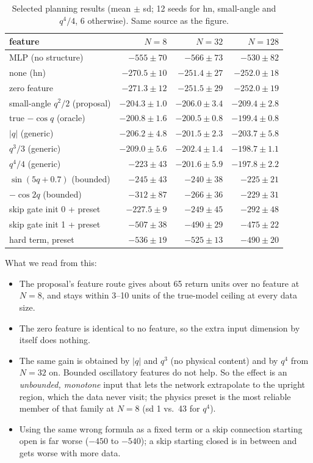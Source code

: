 \documentclass[11pt]{article}
\begin{document}
\begin{table}[h]
\centering\small
\caption{Selected planning results (mean $\pm$ sd; 12 seeds for hn, small-angle and $q^4/4$, 6 otherwise). Same source as the figure.}
\begin{tabular}{lrrr}
\toprule
feature & $N=8$ & $N=32$ & $N=128$ \\
\midrule
MLP (no structure) & $-555\pm70$ & $-566\pm73$ & $-530\pm82$ \\
none (hn) & $-270.5\pm10$ & $-251.4\pm27$ & $-252.0\pm18$ \\
zero feature & $-271.3\pm12$ & $-251.5\pm29$ & $-252.0\pm19$ \\
small-angle $q^2/2$ (proposal) & $\mathbf{-204.3\pm1.0}$ & $-206.0\pm3.4$ & $-209.4\pm2.8$ \\
true $-\cos q$ (oracle) & $-200.8\pm1.6$ & $-200.5\pm0.8$ & $-199.4\pm0.8$ \\
$|q|$ (generic) & $-206.2\pm4.8$ & $-201.5\pm2.3$ & $-203.7\pm5.8$ \\
$q^3/3$ (generic) & $-209.0\pm5.6$ & $-202.4\pm1.4$ & $-198.7\pm1.1$ \\
$q^4/4$ (generic) & $-223\pm43$ & $-201.6\pm5.9$ & $-197.8\pm2.2$ \\
$\sin(5q+0.7)$ (bounded) & $-245\pm43$ & $-240\pm38$ & $-225\pm21$ \\
$-\cos 2q$ (bounded) & $-312\pm87$ & $-266\pm36$ & $-229\pm31$ \\
skip gate init 0 + preset & $-227.5\pm9$ & $-249\pm45$ & $-292\pm48$ \\
skip gate init 1 + preset & $-507\pm38$ & $-490\pm29$ & $-475\pm22$ \\
hard term, preset & $-536\pm19$ & $-525\pm13$ & $-490\pm20$ \\
\bottomrule
\end{tabular}
\end{table}

What we read from this:
\begin{itemize}
\item The proposal's feature route gives about 65 return units over no feature at $N=8$, and stays within 3--10 units of the true-model ceiling at every data size.
\item The zero feature is identical to no feature, so the extra input dimension by itself does nothing.
\item The same gain is obtained by $|q|$ and $q^3$ (no physical content) and by $q^4$ from $N=32$ on. Bounded oscillatory features do not help. So the effect is an \emph{unbounded, monotone} input that lets the network extrapolate to the upright region, which the data never visit; the physics preset is the most reliable member of that family at $N=8$ (sd 1 vs.\ 43 for $q^4$).
\item Using the same wrong formula as a fixed term or a skip connection starting open is far worse ($-450$ to $-540$); a skip starting closed is in between and gets worse with more data.
\end{itemize}
\end{document}
